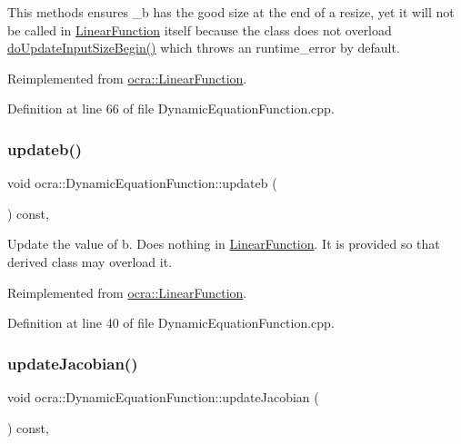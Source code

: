 This methods ensures \+\_\+b has the good size at the end of a resize, yet it will not be called in \hyperlink{classocra_1_1LinearFunction}{Linear\+Function} itself because the class does not overload \hyperlink{classocra_1_1DynamicEquationFunction_a6fc52fcd947fa303e55729dbb286b92c}{do\+Update\+Input\+Size\+Begin()} which throws an runtime\+\_\+error by default. 

Reimplemented from \hyperlink{classocra_1_1LinearFunction_ac6bdf62ad6634397778d5f4223ed6d82}{ocra\+::\+Linear\+Function}.



Definition at line 66 of file Dynamic\+Equation\+Function.\+cpp.

\hypertarget{classocra_1_1DynamicEquationFunction_ae1fe835a481f5f0bde6c8b0fa8ea09b2}{}\label{classocra_1_1DynamicEquationFunction_ae1fe835a481f5f0bde6c8b0fa8ea09b2} 
\subsubsection{\texorpdfstring{updateb()}{updateb()}}
{\footnotesize\ttfamily void ocra\+::\+Dynamic\+Equation\+Function\+::updateb (\begin{DoxyParamCaption}{ }\end{DoxyParamCaption}) const\hspace{0.3cm}{\ttfamily [protected]}, {\ttfamily [virtual]}}

Update the value of b. Does nothing in \hyperlink{classocra_1_1LinearFunction}{Linear\+Function}. It is provided so that derived class may overload it. 

Reimplemented from \hyperlink{classocra_1_1LinearFunction_a546454cd8d0909f99433ffc0e700c9e3}{ocra\+::\+Linear\+Function}.



Definition at line 40 of file Dynamic\+Equation\+Function.\+cpp.

\hypertarget{classocra_1_1DynamicEquationFunction_a81d71c87d0f52b3d321614c6219022ad}{}\label{classocra_1_1DynamicEquationFunction_a81d71c87d0f52b3d321614c6219022ad} 
\subsubsection{\texorpdfstring{update\+Jacobian()}{updateJacobian()}}
{\footnotesize\ttfamily void ocra\+::\+Dynamic\+Equation\+Function\+::update\+Jacobian (\begin{DoxyParamCaption}{ }\end{DoxyParamCaption}) const\hspace{0.3cm}{\ttfamily [protected]}, {\ttfamily [virtual]}}



